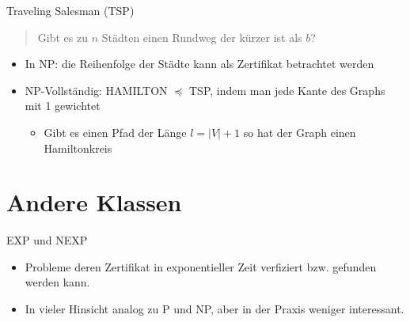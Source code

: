 \documentclass[ignorenonframetext,]{beamer}
\begin{document}
\begin{frame}{Traveling Salesman (TSP)}

\begin{quote}
Gibt es zu $n$ Städten einen Rundweg der kürzer ist als $b$?
\end{quote}

\begin{itemize}
\itemsep1pt\parskip0pt
\item
  In NP: die Reihenfolge der Städte kann als Zertifikat betrachtet
  werden
\item
  NP-Vollständig: HAMILTON $\preceq$ TSP, indem man jede Kante des
  Graphs mit 1 gewichtet

  \begin{itemize}
  \itemsep1pt\parskip0pt
  \item
    Gibt es einen Pfad der Länge $l = |V|+1$ so hat der Graph einen
    Hamiltonkreis
  \end{itemize}
\end{itemize}

\end{frame}

\section{Andere Klassen}\label{andere-klassen}

\begin{frame}{EXP und NEXP}

\begin{itemize}
\itemsep1pt\parskip0pt
\item
  Probleme deren Zertifikat in exponentieller Zeit verfiziert bzw.
  gefunden werden kann.
\item
  In vieler Hinsicht analog zu P und NP, aber in der Praxis weniger
  interessant.
\end{itemize}

\end{frame}
\end{document}
